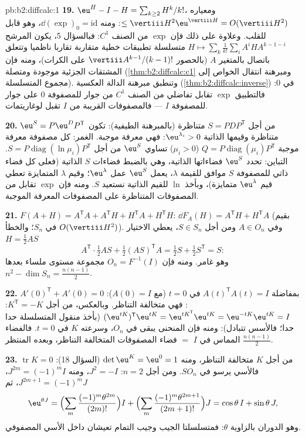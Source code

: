\begin{solution}{pb:b2:diffcalc:1}
\textbf{19.} $\eu^H - I - H = \sum_{k\geq2}H^k/k!$، ومعياره $\leq \vertiii H^2\eu^{\vertiii H} = O(\vertiii H^2)$:
ومنه $\dd(\exp)_0 = \mathrm{id}$، وهو قابل للقلب. وعلاوة على ذلك فإن $\exp$ من الصنف
$C^1$: فبالسؤال 5، يكون  المرشح $H \mapsto
\sum_k\frac1{k!}\sum_iA^iHA^{k-1-i}$ متسلسلة تطبيقات خطية
متقاربة تقاربا ناظميا وتتعلق باتصال بالمتغير $A$ (بالحصور
$\vertiii A^{k-1}/(k-1)!$ على الكرات)، ومنه فإن المشتقات الجزئية موجودة ومتصلة
(\cref{thm:b2:diffcalc:c1} ومبرهنة انتقال الخواص إلى مجموع المتسلسلة). وتنطبق مبرهنة
الدالة العكسية (\cref{thm:b2:diffcalc:inverse}) في $0$: فالتطبيق $\exp$ تقابل تفاضلي من
الصنف $C^1$ من جوار للمصفوفة $0$ على جوار للمصفوفة $I$ ---
فالمصفوفات القريبة من $I$ تقبل لوغاريتمات.

\textbf{20.} من أجل $S = PDP^{\mathsf T}$ متناظرة (بالمبرهنة الطيفية): تكون $\eu^S = P\eu^DP^{\mathsf T}$
متناظرة وقيمها الذاتية $\eu^{\lambda_i} > 0$: فهي معرفة موجبة.
الغمر: كل مصفوفة معرفة موجبة $Q =
P\operatorname{diag}(\mu_i)P^{\mathsf T}$ ($\mu_i > 0$) تساوي
$\eu^S$ من أجل $S = P\operatorname{diag}(\ln\mu_i)P^{\mathsf T}$.
التباين: تحدد $\eu^S$ فضاءاتها الذاتية، وهي بالضبط فضاءات $S$
الذاتية (فعلى كل فضاء ذاتي للمصفوفة $S$ موافق للقيمة $\lambda$،
يعمل $\eu^S$ عمل $\eu^\lambda$؛ وقيم $\lambda$ المتمايزة تعطي قيم $\eu^\lambda$
متمايزة)، وبأخذ $\ln$ للقيم الذاتية نستعيد $S$. ومنه فإن $\exp$
تقابل من المصفوفات المتناظرة على المصفوفات المعرفة الموجبة.

\textbf{21.} $F(A + H) = A^{\mathsf T}A + A^{\mathsf T}H +
H^{\mathsf T}A + H^{\mathsf T}H$: $\dd F_A(H) =
A^{\mathsf T}H + H^{\mathsf T}A$ (بقيم في $S_n$؛ والخطأ $O(\vertiii H^2)$). وفي
$A \in O_n$ ومن أجل $S \in S_n$، يعطي الاختيار $H = \frac12AS$
\[
A^{\mathsf T}\cdot\tfrac12AS + \tfrac12(AS)^{\mathsf T}A
= \tfrac12 S + \tfrac12 S^{\mathsf T} = S :
\]
وهو غامر. ومنه فإن $O_n = F^{-1}(I)$ مجموعة مستوى ملساء بعدها $n^2 - \dim S_n = \frac{n(n-1)}2$.

\textbf{22.} بمفاضلة $A(t)^{\mathsf T}A(t) = I$ في $t
= 0$ (مع $A(0) = I$): $A'(0)^{\mathsf T} + A'(0) = 0$: فهي
متخالفة التناظر. وبالعكس، من أجل $K^{\mathsf T} = -K$:
$(\eu^{tK})^{\mathsf T}\eu^{tK} = \eu^{tK^{\mathsf T}}
\eu^{tK} = \eu^{-tK}\eu^{tK} = I$ (بأخذ منقول المتسلسلة حدا حدا؛ فالأسس تتبادل): ومنه فإن
المنحنى يبقى في $O_n$، وسرعته $K$ في $t = 0$. فالفضاء المماس في
$I$ $=$ فضاء المصفوفات المتخالفة التناظر، وبعده المنتظر
$\frac{n(n-1)}2$.

\textbf{23.} $\operatorname{tr}K = 0$ من أجل $K$ متخالفة التناظر، ومنه $\det\eu^K = \eu^0 = 1$
(السؤال 18): فالأسي يرسو في $SO_n$. ومن أجل $n = 2$: $J^2 = -I$، ومنه
$J^{2m} =
(-1)^mI$، $J^{2m+1} = (-1)^mJ$، ثم
\[
\eu^{\theta J}
= \Bigl(\sum_m\frac{(-1)^m\theta^{2m}}{(2m)!}\Bigr)I
+ \Bigl(\sum_m\frac{(-1)^m\theta^{2m+1}}{(2m+1)!}\Bigr)J
= \cos\theta\,I + \sin\theta\,J ,
\]
وهو الدوران بالزاوية $\theta$: فمتسلسلتا الجيب وجيب التمام تعيشان
داخل الأسي المصفوفي.


\end{solution}
